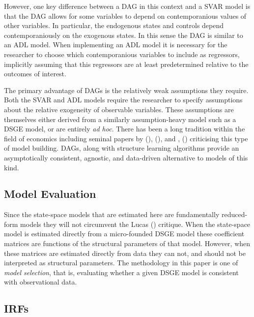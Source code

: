 \documentclass{article}
\begin{document}
However, one key difference between a DAG in this context and a SVAR model is that the DAG allows for some variables to depend on contemporanious values of other variables. In particular, the endogenous states and controls depend contemporaniously on the exogenous states. In this sense the DAG is similar to an ADL model. When implementing an ADL model it is necessary for the researcher to choose which contemporanious variables to include as regressors, implicitly assuming that this regressors are at least predetermined relative to the outcomes of interest. 

The primary advantage of DAGs is the relatively weak assumptions they require. Both the SVAR and ADL models require the researcher to specify assumptions about the relative exogeneity of observable variables. These assumptions are themselves either derived from a similarly assumption-heavy model such as a DSGE model, or are entirely \textit{ad hoc}. There has been a long tradition within the field of economics including seminal papers by \citeauthor{lucas1976econometric} (\citeyear{lucas1976econometric}), \citeauthor{sims1980macroeconomics} (\citeyear{sims1980macroeconomics}), and \citeauthor{jorda2005estimation}, (\citeyear{jorda2005estimation}) criticising this type of model building. DAGs, along with structure learning algorithms provide an asymptotically consistent, agnostic, and data-driven alternative to models of this kind.

\subsection{Model Evaluation}

Since the state-space models that are estimated here are fundamentally reduced-form models they will not circumvent the Lucas (\citeyear{lucas1976econometric}) critique. When the state-space model is estimated directly from a micro-founded DSGE model these coefficient matrices are functions of the structural parameters of that model. However, when these matrices are estimated directly from data they can not, and should not be interpreted as structural parameters. The methodology in this paper is one of \textit{model selection}, that is, evaluating whether a given DSGE model is consistent with observational data. 

\subsection{IRFs}
\end{document}
